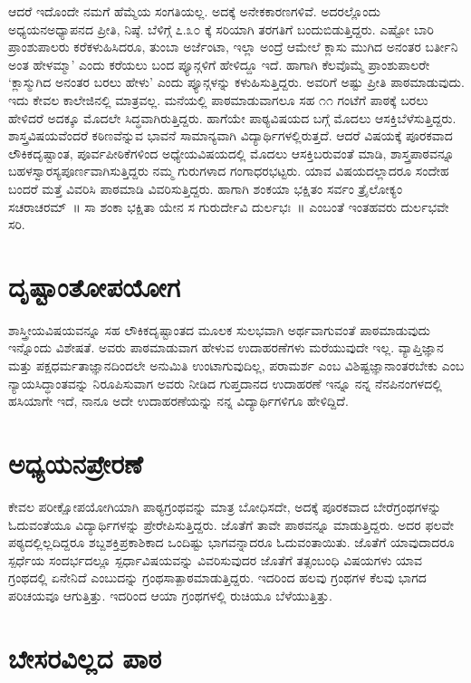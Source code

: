 {ಆದರೆ ಇದೊಂದೇ ನಮಗೆ ಹೆಮ್ಮೆಯ ಸಂಗತಿಯಲ್ಲ. ಅದಕ್ಕೆ ಅನೇಕಕಾರಣಗಳಿವೆ. ಅದರಲ್ಲೊಂದು ಅಧ್ಯಯನ\enginline{-}ಅಧ್ಯಾಪನದ ಪ್ರೀತಿ, ನಿಷ್ಠೆ. ಬೆಳಿಗ್ಗೆ ೭.೩೦ ಕ್ಕೆ ಸರಿಯಾಗಿ ತರ\-ಗತಿಗೆ ಬಂದುಬಿಡುತ್ತಿದ್ದರು. ಎಷ್ಟೋ ಬಾರಿ ಪ್ರಾಂಶುಪಾಲರು ಕರೆಕಳುಹಿಸಿದರೂ, ತುಂಬಾ ಅರ್ಜೆಂಟಾ, ಇಲ್ಲಾ ಅಂದ್ರೆ ಆಮೇಲೆ ಕ್ಲಾಸು ಮುಗಿದ ಅನಂತರ ಬರ್ತೀನಿ ಅಂತ ಹೇಳಮ್ಮಾ’ ಎಂದು ಕರೆಯಲು ಬಂದ ಪ್ಯೂನ್ಗಳಿಗೆ ಹೇಳಿದ್ದೂ ಇದೆ. ಹಾಗಾಗಿ ಕೆಲವೊಮ್ಮೆ ಪ್ರಾಂಶುಪಾಲರೇ ‘ಕ್ಲಾಸ್ಮುಗಿದ ಅನಂತರ ಬರಲು ಹೇಳು’ ಎಂದು ಪ್ಯೂನ್ಗಳನ್ನು ಕಳುಹಿಸುತ್ತಿದ್ದರು. ಅವರಿಗೆ ಅಷ್ಟು ಪ್ರೀತಿ ಪಾಠಮಾಡುವುದು. ಇದು ಕೇವಲ ಕಾಲೇಜಿನಲ್ಲಿ ಮಾತ್ರವಲ್ಲ. ಮನೆಯಲ್ಲಿ ಪಾಠಮಾಡುವಾಗಲೂ ಸಹ ೧೧ ಗಂಟೆಗೆ ಪಾಠಕ್ಕೆ ಬರಲು ಹೇಳಿದರೆ ಅದಕ್ಕೂ ಮೊದಲೇ ಸಿದ್ಧವಾಗಿರುತ್ತಿದ್ದರು.
ಹಾಗೆಯೇ ಪಾಠ್ಯವಿಷಯದ ಬಗ್ಗೆ ಮೊದಲು ಆಸಕ್ತಿಬೆಳೆಸುತ್ತಿದ್ದರು. ಶಾಸ್ತ್ರವಿಷಯವೆಂದರೆ ಕಠಿಣವೆನ್ನುವ ಭಾವನೆ ಸಾಮಾನ್ಯ\-ವಾಗಿ ವಿದ್ಯಾರ್ಥಿಗಳಲ್ಲಿರುತ್ತದೆ. ಆದರೆ ವಿಷಯಕ್ಕೆ ಪೂರಕವಾದ ಲೌಕಿಕದೃಷ್ಟಾಂತ, ಪೂರ್ವಪೀಠಿಕೆಗಳಿಂದ ಅಧ್ಯೇಯವಿಷಯದಲ್ಲಿ ಮೊದಲು ಆಸಕ್ತಿಬರುವಂತೆ ಮಾಡಿ, ಶಾಸ್ತ್ರಪಾಠವನ್ನೂ ಬಹಳಸ್ವಾರಸ್ಯಪೂರ್ಣವಾಗಿಸುತ್ತಿದ್ದರು ನಮ್ಮ ಗುರುಗಳಾದ ಗಂಗಾಧರಭಟ್ಟರು. ಯಾವ ವಿಷಯದಲ್ಲಾದರೂ ಸಂದೇಹ ಬಂದರೆ ಮತ್ತೆ ವಿವರಿಸಿ ಪಾಠಮಾಡಿ ವಿವರಿಸುತ್ತಿದ್ದರು. ಹಾಗಾಗಿ ಶಂಕಯಾ ಭಕ್ಷಿತಂ ಸರ್ವಂ ತ್ರೈಲೋಕ್ಯಂ ಸಚರಾಚರಮ್~॥ ಸಾ ಶಂಕಾ ಭಕ್ಷಿತಾ ಯೇನ ಸ ಗುರುರ್ದೇವಿ ದುರ್ಲಭಃ~॥ ಎಂಬಂತೆ ಇಂತಹವರು ದುರ್ಲಭವೇ ಸರಿ.

\section*{ದೃಷ್ಟಾಂತೋಪಯೋಗ}

ಶಾಸ್ತ್ರೀಯವಿಷಯವನ್ನೂ ಸಹ ಲೌಕಿಕದೃಷ್ಟಾಂತದ ಮೂಲಕ ಸುಲಭವಾಗಿ ಅರ್ಥವಾಗುವಂತೆ ಪಾಠಮಾಡುವುದು ಇನ್ನೊಂದು ವಿಶೇಷತೆ. ಅವರು ಪಾಠಮಾಡುವಾಗ ಹೇಳುವ ಉದಾಹರಣೆಗಳು ಮರೆಯುವುದೇ ಇಲ್ಲ. ವ್ಯಾಪ್ತಿಜ್ಞಾನ ಮತ್ತು ಪಕ್ಷಧರ್ಮತಾಜ್ಞಾನದಿಂದಲೇ ಅನುಮಿತಿ ಉಂಟಾಗುವುದಿಲ್ಲ, ಪರಾಮರ್ಶ ಎಂಬ ವಿಶಿಷ್ಟಜ್ಞಾನಾಂತರಬೇಕು ಎಂಬ ನ್ಯಾಯಸಿದ್ಧಾಂತವನ್ನು ನಿರೂಪಿಸುವಾಗ ಅವರು ನೀಡಿದ ಗುಪ್ತದಾನದ ಉದಾಹರಣೆ ಇನ್ನೂ ನನ್ನ ನೆನಪಿನಂಗಳದಲ್ಲಿ ಹಸಿಯಾಗೇ ಇದೆ, ನಾನೂ ಅದೇ ಉದಾಹರಣೆಯನ್ನು ನನ್ನ ವಿದ್ಯಾರ್ಥಿಗಳಿಗೂ ಹೇಳಿದ್ದಿದೆ.

\section*{ಅಧ್ಯಯನಪ್ರೇರಣೆ}

ಕೇವಲ ಪರೀಕ್ಷೋಪಯೋಗಿಯಾಗಿ ಪಾಠ್ಯಗ್ರಂಥವನ್ನು ಮಾತ್ರ ಬೋಧಿಸದೇ, ಅದಕ್ಕೆ ಪೂರಕವಾದ ಬೇರೆಗ್ರಂಥಗಳನ್ನು ಓದುವಂತೆಯೂ ವಿದ್ಯಾರ್ಥಿಗಳನ್ನು ಪ್ರೇರೇಪಿಸು\-ತ್ತಿದ್ದರು. ಜೊತೆಗೆ ತಾವೇ ಪಾಠವನ್ನೂ ಮಾಡುತ್ತಿದ್ದರು. ಅದರ ಫಲವೇ ಪಠ್ಯದಲ್ಲಿಲ್ಲದಿದ್ದರೂ ಶಬ್ದಶಕ್ತಿಪ್ರಕಾಶಿಕಾದ ಒಂದಿಷ್ಟು ಭಾಗವನ್ನಾದರೂ ಓದುವಂತಾಯಿತು. ಜೊತೆಗೆ ಯಾವುದಾದರೂ ಸ್ಪರ್ಧೆಯ ಸಂದರ್ಭದಲ್ಲೂ ಸ್ಪರ್ಧಾವಿಷಯವನ್ನು ವಿವರಿಸುವುದರ ಜೊತೆಗೆ ತತ್ಸಂಬಂಧಿ ವಿಷಯಗಳು ಯಾವ ಗ್ರಂಥದಲ್ಲಿ ಏನೇನಿದೆ ಎಂಬುದನ್ನು ಗ್ರಂಥಸಾತ್ಪಾಠಮಾಡುತ್ತಿದ್ದರು. ಇದರಿಂದ ಹಲವು ಗ್ರಂಥಗಳ ಕೆಲವು ಭಾಗದ ಪರಿಚಯವೂ ಆಗುತ್ತಿತ್ತು. ಇದರಿಂದ ಆಯಾ ಗ್ರಂಥಗಳಲ್ಲಿ ರುಚಿಯೂ ಬೆಳೆಯುತ್ತಿತ್ತು.

\section*{ಬೇಸರವಿಲ್ಲದ ಪಾಠ}

}

